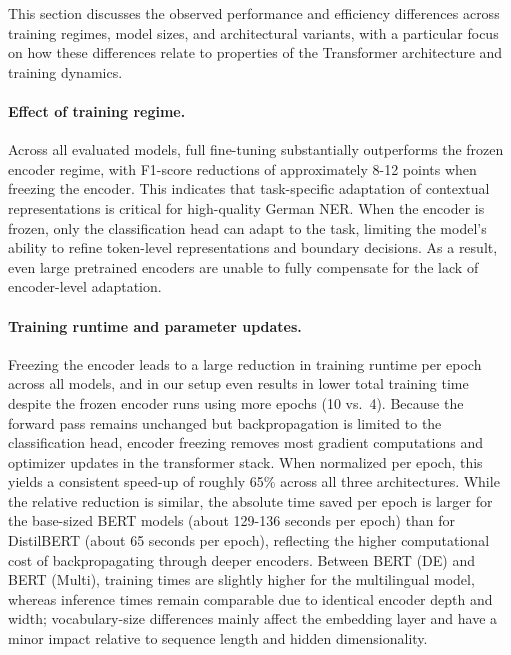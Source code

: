 \documentclass[11pt,a4paper,twocolumn]{article}
\begin{document}
This section discusses the observed performance and efficiency differences across training regimes, model sizes, and architectural variants, with a particular focus on how these differences relate to properties of the Transformer architecture and training dynamics.

\paragraph{Effect of training regime.}
Across all evaluated models, full fine-tuning substantially outperforms the frozen encoder regime, with F1-score reductions of approximately 8-12 points when freezing the encoder. This indicates that task-specific adaptation of contextual representations is critical for high-quality German NER. When the encoder is frozen, only the classification head can adapt to the task, limiting the model’s ability to refine token-level representations and boundary decisions. As a result, even large pretrained encoders are unable to fully compensate for the lack of encoder-level adaptation.

\paragraph{Training runtime and parameter updates.}
Freezing the encoder leads to a large reduction in training runtime per epoch across all models, and in our setup even results in lower total training time despite the frozen encoder runs using more epochs (10 vs.\ 4).
Because the forward pass remains unchanged but backpropagation is limited to the classification head, encoder freezing removes most gradient computations and optimizer updates in the transformer stack.
When normalized per epoch, this yields a consistent speed-up of roughly 65\% across all three architectures.
While the relative reduction is similar, the absolute time saved per epoch is larger for the base-sized BERT models (about 129-136 seconds per epoch) than for DistilBERT (about 65 seconds per epoch), reflecting the higher computational cost of backpropagating through deeper encoders.
Between BERT (DE) and BERT (Multi), training times are slightly higher for the multilingual model, whereas inference times remain comparable due to identical encoder depth and width; vocabulary-size differences mainly affect the embedding layer and have a minor impact relative to sequence length and hidden dimensionality.
\end{document}
